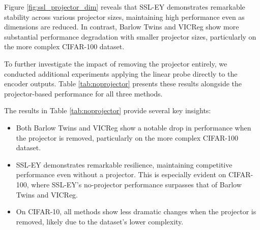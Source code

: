 Figure \ref{fig:ssl_projector_dim} reveals that SSL-EY demonstrates remarkable stability across various projector sizes, maintaining high performance even as dimensions are reduced. In contrast, Barlow Twins and VICReg show more substantial performance degradation with smaller projector sizes, particularly on the more complex CIFAR-100 dataset.

To further investigate the impact of removing the projector entirely, we conducted additional experiments applying the linear probe directly to the encoder outputs. Table \ref{tab:noprojector} presents these results alongside the projector-based performance for all three methods.

\begin{table}[H]
    \centering
    \caption{Comparison of SSL method performance with and without projector on CIFAR-10 and CIFAR-100 datasets.}
    \label{tab:noprojector}
\end{table}

The results in Table \ref{tab:noprojector} provide several key insights:

\begin{itemize}
    \item Both Barlow Twins and VICReg show a notable drop in performance when the projector is removed, particularly on the more complex CIFAR-100 dataset.
    \item SSL-EY demonstrates remarkable resilience, maintaining competitive performance even without a projector. This is especially evident on CIFAR-100, where SSL-EY's no-projector performance surpasses that of Barlow Twins and VICReg.
    \item On CIFAR-10, all methods show less dramatic changes when the projector is removed, likely due to the dataset's lower complexity.
\end{itemize}

